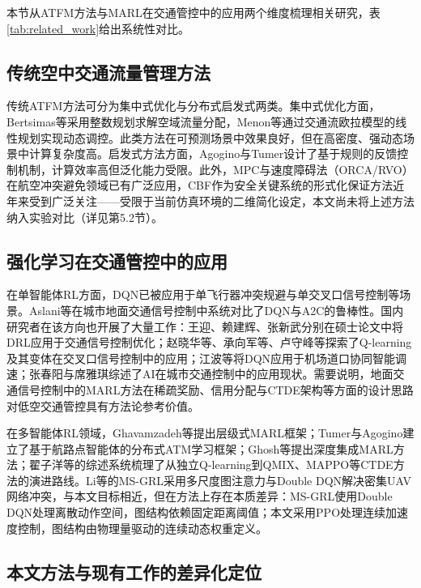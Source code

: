 \documentclass[12pt,a4paper,UTF8]{ctexart}
\begin{document}
本节从ATFM方法与MARL在交通管控中的应用两个维度梳理相关研究，表\ref{tab:related_work}给出系统性对比。

\subsection{传统空中交通流量管理方法}

传统ATFM方法可分为集中式优化与分布式启发式两类。集中式优化方面，Bertsimas等采用整数规划求解空域流量分配，Menon等通过交通流欧拉模型的线性规划实现动态调控\cite{ref6}。此类方法在可预测场景中效果良好，但在高密度、强动态场景中计算复杂度高。启发式方法方面，Agogino与Tumer设计了基于规则的反馈控制机制\cite{ref4}，计算效率高但泛化能力受限。此外，MPC与速度障碍法（ORCA/RVO）\cite{ref22}在航空冲突避免领域已有广泛应用，CBF\cite{ref23}作为安全关键系统的形式化保证方法近年来受到广泛关注——受限于当前仿真环境的二维简化设定，本文尚未将上述方法纳入实验对比（详见第5.2节）。

\subsection{强化学习在交通管控中的应用}

在单智能体RL方面，DQN已被应用于单飞行器冲突规避与单交叉口信号控制等场景。Aslani等在城市地面交通信号控制中系统对比了DQN与A2C的鲁棒性\cite{ref10}。国内研究者在该方向也开展了大量工作：王迎\cite{ref13}、赖建辉\cite{ref16}、张新武\cite{ref17}分别在硕士论文中将DRL应用于交通信号控制优化；赵晓华等\cite{ref14}、承向军等\cite{ref15}、卢守峰等\cite{ref18}探索了Q-learning及其变体在交叉口信号控制中的应用；江波等将DQN应用于机场道口协同智能调速\cite{ref19}；张春阳与席雅琪综述了AI在城市交通控制中的应用现状\cite{ref8}。需要说明，地面交通信号控制中的MARL方法在稀疏奖励、信用分配与CTDE架构等方面的设计思路对低空交通管控具有方法论参考价值。

在多智能体RL领域，Ghavamzadeh等提出层级式MARL框架\cite{ref12}；Tumer与Agogino建立了基于航路点智能体的分布式ATM学习框架\cite{ref2,ref4,ref5}；Ghosh等提出深度集成MARL方法\cite{ref9}；翟子洋等的综述系统梳理了从独立Q-learning到QMIX、MAPPO等CTDE方法的演进路线\cite{ref11}。Li等的MS-GRL采用多尺度图注意力与Double DQN解决密集UAV网络冲突\cite{ref24}，与本文目标相近，但在方法上存在本质差异：MS-GRL使用Double DQN处理离散动作空间，图结构依赖固定距离阈值；本文采用PPO处理连续加速度控制，图结构由物理量驱动的连续动态权重定义。

\subsection{本文方法与现有工作的差异化定位}
\end{document}
